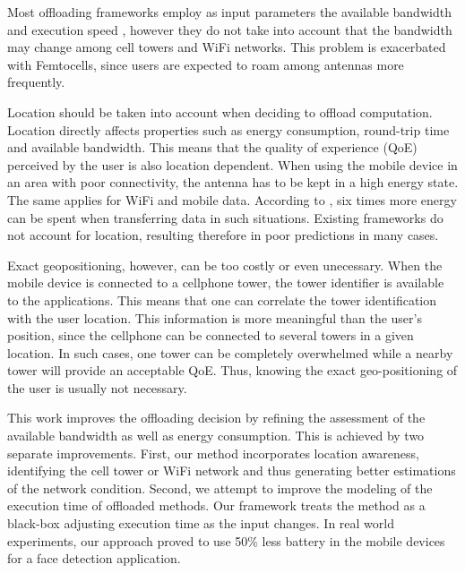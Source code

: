 \documentclass[10pt, conference, letterpaper]{IEEEtran}
\begin{document}
  
Most offloading frameworks employ as input parameters the available bandwidth and execution speed \cite{Cuervo:2010:MMS:1814433.1814441,Chun:2011:CEE:1966445.1966473,Shi:2014:CCO:2632951.2632958}, however they do not take into account that the bandwidth may change among cell towers and WiFi networks. This problem is exacerbated with Femtocells, since users are expected to roam among antennas more frequently.
 
Location should be taken into account when deciding to offload computation. Location directly affects properties such as energy consumption, round-trip time and available bandwidth. This means that the quality of experience (QoE) perceived by the user is also location dependent. When using the mobile device in an area with poor connectivity, the antenna has to be kept in a high energy state. The same applies for WiFi and mobile data. According to \cite{Schulman10bartendr:a}, six times more energy can be spent when transferring data in such situations. Existing frameworks do not account for location, resulting therefore in poor predictions in many cases.
   
 Exact geopositioning, however, can be too costly or even unecessary. When the mobile device is connected to a cellphone tower, the tower identifier is available to the applications. This means that one can  correlate the tower identification with the user location. This information is more meaningful than the user's position, since the cellphone can be connected to several towers in a given location. In such cases, one tower can be completely overwhelmed while a nearby tower will provide an acceptable QoE. Thus,  knowing the exact geo-positioning of the user is usually not necessary. 
   

This work improves the offloading decision by refining the assessment of the available bandwidth as well as energy consumption. This is achieved by two separate improvements. First, our method incorporates location awareness, identifying the cell tower or WiFi network and thus generating better estimations of the network condition. Second, we attempt to improve the modeling of the execution time of offloaded methods. Our framework treats the method as a black-box adjusting execution time as the input changes. In real world experiments, our approach proved to use 50\% less battery in the mobile devices for a face detection application.
\end{document}
